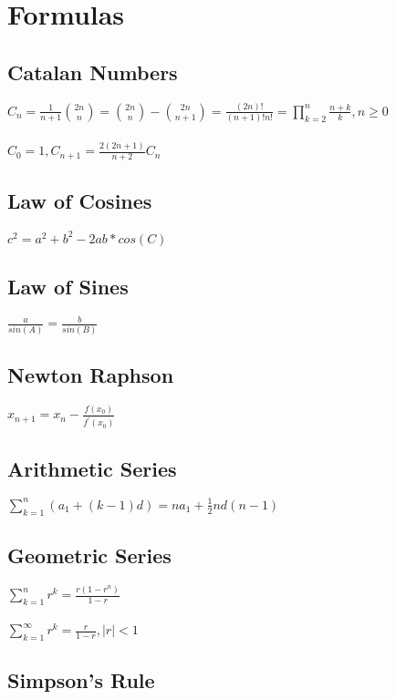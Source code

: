 \section{Formulas}

\subsection{Catalan Numbers}

$C_n = \frac{1}{n+1}{2n \choose n} = {2n \choose n} - {2n \choose n+1} = \frac{(2n)!}{(n+1)!n!} = \prod_{k=2}^n\frac{n+k}{k}, n \geq 0$\\
\\
$C_0 = 1, C_{n+1} = \frac{2(2n+1)}{n+2}C_n$

\subsection{Law of Cosines}

$c^2 = a^2 + b^2 - 2ab*cos(C)$

\subsection{Law of Sines}

$\frac{a}{sin(A)} = \frac{b}{sin(B)}$

\subsection{Newton Raphson}

$x_{n+1} = x_n - \frac{f(x_0)}{f^\prime(x_0)}$

\subsection{Arithmetic Series}

$\sum_{k=1}^{n} (a_1+(k-1)d) = na_1+\frac{1}{2}nd(n-1)$

\subsection{Geometric Series}

$\sum_{k=1}^nr^k = \frac{r(1-r^n)}{1-r}$\\
\\
$\sum_{k=1}^{\infty} r^k = \frac{r}{1-r}, |r| < 1$

\subsection{Simpson's Rule}

